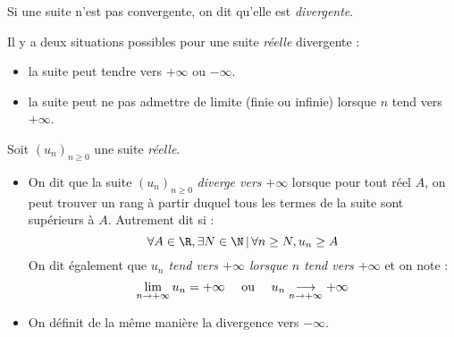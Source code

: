 \documentclass[french,11pt,twoside]{VcCours}
\begin{document}
\begin{Demonstration}{}

\vspace{10cm}
%
%
%

\end{Demonstration}

\begin{Definition}{}
	Si une suite n'est pas convergente, on dit qu'elle est \emph{divergente}.
\end{Definition}

Il y a deux situations possibles pour une suite \emph{réelle} divergente :
\begin{itemize}
 \item la suite peut tendre vers $+\infty$ ou $-\infty$.
 \item la suite peut ne pas admettre de limite (finie ou infinie) lorsque $n$ tend vers $+\infty$.
\end{itemize}


\begin{Definition}{}
Soit $(u_n)_{n \geq 0}$ une suite \emph{réelle}.
\begin{itemize}
\item On dit que la suite $(u_n)_{n \geq 0}$ \emph{diverge vers} $+\infty$ lorsque pour tout réel $A$, on peut trouver un rang à partir duquel tous les termes de la suite sont supérieurs à $A$. Autrement dit si :
$$\forall A \in \R, \exists N \in \N \, \vert \, \forall n \ge N, u_n \geq A $$
On dit également que \emph{$u_n$ tend vers $+\infty$ lorsque $n$ tend vers $+\infty$} et on note :
$$\displaystyle{\lim_{n \rightarrow +\infty}u_n=+\infty} \quad \hbox{ ou } \quad u_n \underset{n \rightarrow + \infty}{\longrightarrow} + \infty $$
\item On définit de la même manière la divergence vers $- \infty$.
\end{itemize}
\end{Definition}
\end{document}
